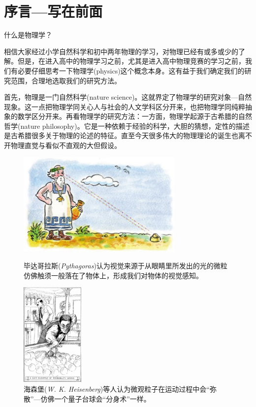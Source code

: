 
\chapter{序言---写在前面}

什么是物理学？

相信大家经过小学自然科学和初中两年物理的学习，对物理已经有或多或少的了解。但是，在进入高中的物理学习之前，尤其是进入高中物理竞赛的学习之前，我们有必要仔细思考一下{\heiti 物理学}(physics)这个概念本身。这有益于我们确定我们的研究范围，合理地选取我们的研究方法。

首先，物理是一门{\heiti 自然科学}(nature science)。这就界定了物理学的{\heiti 研究对象}---自然现象。这一点把物理学同关心人与社会的人文学科区分开来，也把物理学同纯粹抽象的数学区分开来。再看物理学的{\heiti 研究方法}：一方面，物理学起源于古希腊的{\heiti 自然哲学}(nature philosophy)。它是一种依赖于经验的科学，大胆的猜想，定性的描述是古希腊很多关于物理的论述的特征。直至今天很多伟大的物理理论的诞生也离不开物理直觉与看似不直观的大但假设。

\begin{figure}[hbp]
\begin{minipage}[c]{0.6\textwidth}
\begin{center}
\includegraphics[height=2in]{images/pre_2.pdf}
\caption{毕达哥拉斯({\it Pythagoras})认为视觉来源于从眼睛里所发出的光的微粒仿佛触须一般落在了物体上，形成我们对物体的视觉感知。}
\end{center}
\end{minipage}
\hspace{1cm}
\begin{minipage}[c]{0.3\textwidth}
\begin{center}
\includegraphics[height=2in]{images/pre_3.pdf}
\caption{海森堡({\it W. K. Heisenberg})等人认为微观粒子在运动过程中会``弥散''---仿佛一个量子台球会``分身术''一样。}
\end{center}
\end{minipage}
\end{figure}


